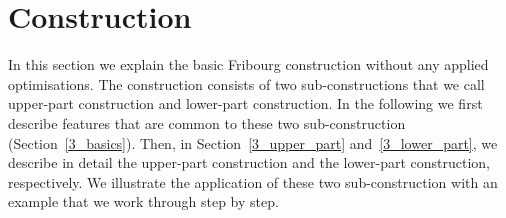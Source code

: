 


\section{Construction}
\label{3_construction}
In this section we explain the basic Fribourg construction without any applied optimisations. The construction consists of two sub-constructions that we call upper-part construction and lower-part construction. In the following  we first describe features that are common to these two sub-construction (Section~\ref{3_basics}). Then, in Section~\ref{3_upper_part} and~\ref{3_lower_part}, we describe in detail the upper-part construction and the lower-part construction, respectively. We illustrate the application of these two sub-construction with an example that we work through step by step.

